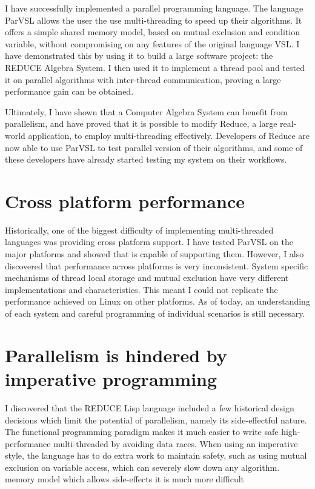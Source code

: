 I have successfully implemented a parallel programming language. The language ParVSL
allows the user the use multi-threading to speed up their algorithms. It offers
a simple shared memory model, based on mutual exclusion and condition variable,
without compromising on any features of the original language VSL. I have demonstrated
this by using it to build a large software project: the REDUCE Algebra System.
I then used it to implement a thread pool and tested it on parallel algorithms with
inter-thread communication, proving a large performance gain can be obtained.

Ultimately, I have shown that a Computer Algebra System can benefit from parallelism,
and have proved that it is possible to modify Reduce, a large real-world application,
to employ multi-threading effectively. Developers of Reduce are now able to
use ParVSL to test parallel version of their algorithms, and some of these developers
have already started testing my system on their workflows.

\section{Cross platform performance}

Historically, one of the biggest difficulty of implementing multi-threaded languages
was providing cross platform support. I have tested ParVSL on the major platforms and
showed that is capable of supporting them. However, I also discovered that performance
across platforms is very inconsistent. System specific mechanisms of thread local storage
and mutual exclusion have very different implementations and characteristics. This meant
I could not replicate the performance achieved on Linux on other platforms. As of today,
an understanding of each system and careful programming of individual scenarios is still
necessary.

\section{Parallelism is hindered by imperative programming}

I discovered that the REDUCE Lisp language included a few historical design decisions which
limit the potential of parallelism, namely its side-effectful nature. The functional programming
paradigm makes it much easier to write safe high-performance multi-threaded by avoiding
data races. When using an imperative style, the language has to do extra work to maintain safety,
such as using mutual exclusion on variable access, which can severely slow down any algorithm.
memory model which allows side-effects it is much more difficult

